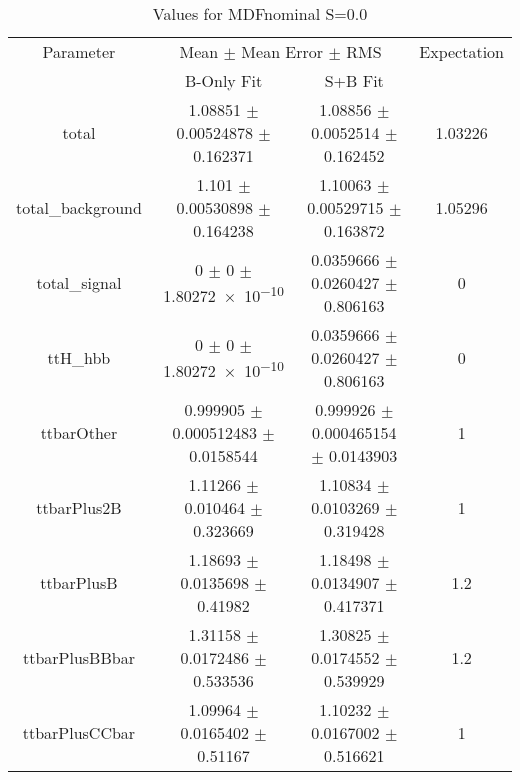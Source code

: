 \begin{table}
\centering
\caption{Values for MDFnominal S=0.0}
\begin{tabular}{cccc}
\toprule
Parameter & \multicolumn{2}{c}{Mean $\pm$ Mean Error $\pm$ RMS} & Expectation\\
 & B-Only Fit & S+B Fit & \\
\midrule
total & \num{1.08851} $\pm$ \num{0.00524878} $\pm$ \num{0.162371} & \num{1.08856} $\pm$ \num{0.0052514} $\pm$ \num{0.162452} & \num{1.03226}\\
total\_background & \num{1.101} $\pm$ \num{0.00530898} $\pm$ \num{0.164238} & \num{1.10063} $\pm$ \num{0.00529715} $\pm$ \num{0.163872} & \num{1.05296}\\
total\_signal & \num{0} $\pm$ \num{0} $\pm$ \num{1.80272e-10} & \num{0.0359666} $\pm$ \num{0.0260427} $\pm$ \num{0.806163} & \num{0}\\
ttH\_hbb & \num{0} $\pm$ \num{0} $\pm$ \num{1.80272e-10} & \num{0.0359666} $\pm$ \num{0.0260427} $\pm$ \num{0.806163} & \num{0}\\
ttbarOther & \num{0.999905} $\pm$ \num{0.000512483} $\pm$ \num{0.0158544} & \num{0.999926} $\pm$ \num{0.000465154} $\pm$ \num{0.0143903} & \num{1}\\
ttbarPlus2B & \num{1.11266} $\pm$ \num{0.010464} $\pm$ \num{0.323669} & \num{1.10834} $\pm$ \num{0.0103269} $\pm$ \num{0.319428} & \num{1}\\
ttbarPlusB & \num{1.18693} $\pm$ \num{0.0135698} $\pm$ \num{0.41982} & \num{1.18498} $\pm$ \num{0.0134907} $\pm$ \num{0.417371} & \num{1.2}\\
ttbarPlusBBbar & \num{1.31158} $\pm$ \num{0.0172486} $\pm$ \num{0.533536} & \num{1.30825} $\pm$ \num{0.0174552} $\pm$ \num{0.539929} & \num{1.2}\\
ttbarPlusCCbar & \num{1.09964} $\pm$ \num{0.0165402} $\pm$ \num{0.51167} & \num{1.10232} $\pm$ \num{0.0167002} $\pm$ \num{0.516621} & \num{1}\\
\bottomrule
\end{tabular}
\end{table}